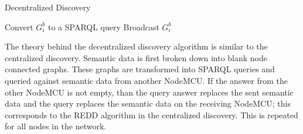 \begin{algorithm}
  \caption{Decentralized Discovery}\label{alg:decentralized}
  \begin{algorithmic}[1]
      	\State Convert $G^{b}_{i}$ to a SPARQL query
        \State Broadcast $G^{b}_{i}$
      \EndFor
    \EndProcedure
  \end{algorithmic}
\end{algorithm}

The theory behind the decentralized discovery algorithm is similar to the centralized discovery. Semantic data is first broken down into blank node connected graphs. These graphs are transformed into SPARQL queries and queried against semantic data from another NodeMCU. If the answer from the other NodeMCU is not empty, than the query answer replaces the sent semantic data and the query replaces the semantic data on the receiving NodeMCU; this corresponds to the REDD algorithm in the centralized discovery. This is repeated for all nodes in the network.